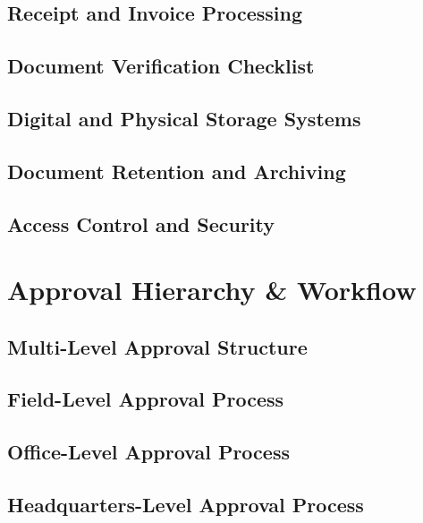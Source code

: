 \subsection{Receipt and Invoice Processing}

\subsection{Document Verification Checklist}

\subsection{Digital and Physical Storage Systems}

\subsection{Document Retention and Archiving}

\subsection{Access Control and Security}

\section{Approval Hierarchy \& Workflow}

\subsection{Multi-Level Approval Structure}

\subsection{Field-Level Approval Process}

\subsection{Office-Level Approval Process}

\subsection{Headquarters-Level Approval Process}

